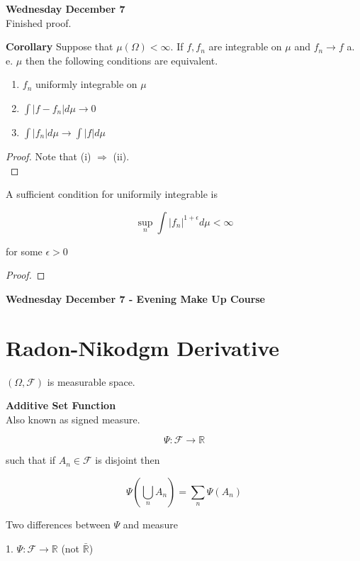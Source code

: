 \documentclass[11pt,fleqn]{book} %
\begin{document}
\textbf{Wednesday December 7}\\

Finished proof. 

\textbf{Corollary} Suppose that $\mu(\Omega) < \infty$. If $f, f_n$ are integrable on $\mu$ and $f_n \rightarrow f$ a. e. $\mu$ then the following conditions are equivalent. 

	\begin{enumerate}
		\item $f_n $ uniformly integrable on $\mu$
		\item $\int |f- f_n| d\mu \rightarrow 0$
		\item $\int |f_n| d\mu \rightarrow \int |f| d\mu$ 
	\end{enumerate}

\begin{proof}
	Note that (i) $\Rightarrow$ (ii).\\

		
\end{proof}

A sufficient condition for uniformily integrable is 

		$$\sup_{n} \int |f_n|^{1+ \epsilon} d\mu < \infty $$

for some $\epsilon > 0$

\begin{proof}
	
\end{proof}

\textbf{Wednesday December 7 - Evening Make Up Course}

\section{Radon-Nikodgm Derivative}

$(\Omega, \mathcal{F})$ is measurable space. 

\textbf{Additive Set Function}\\

Also known as signed measure. 

		$$\Psi: \mathcal{F} \rightarrow \mathbb{R} $$

such that if $A_n \in \mathcal{F}$ is disjoint then 

		$$\Psi (\bigcup_n A_n) = \sum_n \Psi(A_n) $$ 

Two differences between $\Psi$ and measure 
	
	1. $\Psi: \mathcal{F} \rightarrow \mathbb{R}$ (not $\bar{\mathbb{R}}$)
\end{document}
